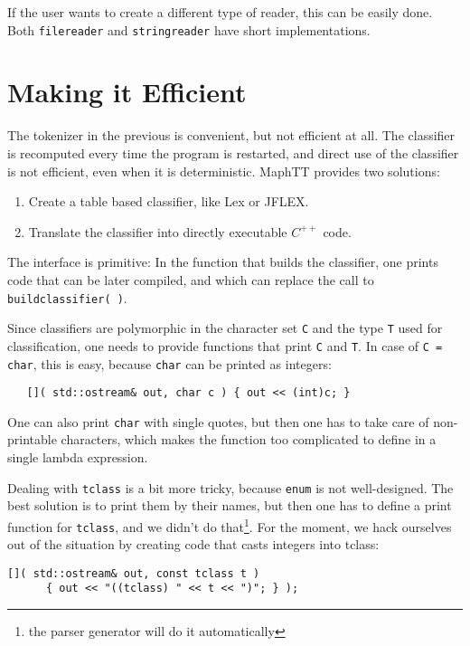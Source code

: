 \documentclass{article}
\begin{document}
\noindent
If the user wants to create a different type of reader, this 
can be easily done. Both \verb+filereader+ and
\verb+stringreader+ have short implementations.

\section{Making it Efficient}
 
The tokenizer in the previous is convenient, but
not efficient at all. The classifier is recomputed every time
the program is restarted, and direct use of the
classifier is not efficient, even when it is deterministic. 
MaphTT provides two solutions:
\begin{enumerate}
\item
   Create a table based classifier, like Lex or JFLEX.
\item
   Translate the classifier into directly executable
   $ C^{++} $ code. 
\end{enumerate} 

\noindent
The interface is primitive:
In the function that builds the classifier, 
one prints code that can be later compiled, and 
which can replace the call to \verb+buildclassifier( )+.

Since classifiers are polymorphic in 
the character set \verb+C+ and the type 
\verb+T+ used for classification,
one needs to provide functions that print
\verb+C+ and \verb+T+.
In case of \verb+C = char+, this is easy, because
\verb+char+ can be printed as integers:
\begin{verbatim}
   []( std::ostream& out, char c ) { out << (int)c; } \end{verbatim}
One can also print \verb+char+ with single quotes, but then
one has to take care of non-printable characters, which makes 
the function too complicated to define in a single 
lambda expression. 

Dealing with \verb+tclass+ is a bit more tricky,
because \verb+enum+ is not well-designed. 
The best solution is to print them by their
names, but then one has to define a print function
for \verb+tclass+, and we didn't do 
that\footnote{the parser generator will do it automatically}. 
For the moment, we hack ourselves out of the situation by
creating code that casts integers into tclass: 
\begin{verbatim}
[]( std::ostream& out, const tclass t ) 
      { out << "((tclass) " << t << ")"; } ); \end{verbatim}
\end{document}
